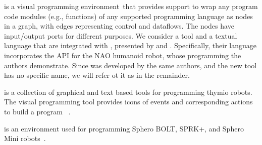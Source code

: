 \parhead{\tivipe} is a visual programming environment\,\cite{lourens:2004:tivipe} that provides support to wrap any program code modules (e.g., functions) of any supported programming language as nodes in a graph, with edges representing control and dataflows. The nodes have input/output ports for different purposes. We consider a tool and a textual language that are integrated with \tivipe, presented by \citet{Lourens2011} and \citet{lourens:2011:tivipe}. Specifically, their language incorporates the API for the NAO humanoid robot, whose programming the authors demonstrate. Since \tivipe was developed by the same authors, and the new tool has no specific name, we will refer ot it as \tivipe in the remainder.

\parhead{\aseba} is a collection of graphical and text based tools for programming thymio robots. The visual programming tool provides icons of events and corresponding actions to build a program ~\cite{ASEBA,Magnenat2011}. %

\parhead{\sphero} is an environment used for programming Sphero BOLT, SPRK+, and Sphero Mini robots~\cite{Sphero}. %


